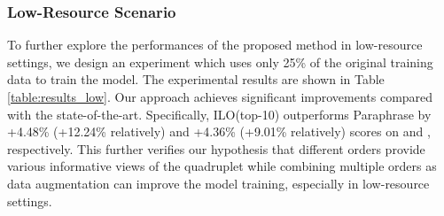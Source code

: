 \documentclass[11pt]{article}
\begin{document}
\begin{table}[]
\small
    \centering
    \caption{Evaluation results in the low-resource scenario, where we only exploit 25\% of the training data on two datasets.}
    \label{table:results_low}
\end{table}

\subsubsection{Low-Resource Scenario}
\label{sec:low_resource}
To further explore the performances of the proposed method in low-resource settings, we design an experiment which uses only 25\% of the original training data to train the model. The experimental results are shown in Table \ref{table:results_low}. Our approach achieves significant improvements compared with the state-of-the-art. Specifically, ILO(top-10) outperforms Paraphrase by +4.48\% (+12.24\% relatively) and +4.36\% (+9.01\% relatively)  scores on  and , respectively. This further verifies our hypothesis that different orders provide various informative views of the quadruplet while combining multiple orders as data augmentation can improve the model training, especially in low-resource settings. 






\begin{comment}
\begin{figure}[t]
\centering
\subfigure[Results on Rest15]{
\texttt{[image: figures/rest15\_valid\_entropy.pdf]}}
\subfigure[Results on Rest16]{
\texttt{[image: figures/rest16\_valid\_entropy.pdf]}}
\caption{Evaluation .}
\label{fig:figure_choosing_effects}
\end{figure}

\begin{figure}[t]
\centering
\texttt{[image: figures/valid\_entropy.pdf]} 
\caption{T.}
\label{fig:valid_entropy}
\end{figure}
\end{comment}
\end{document}
